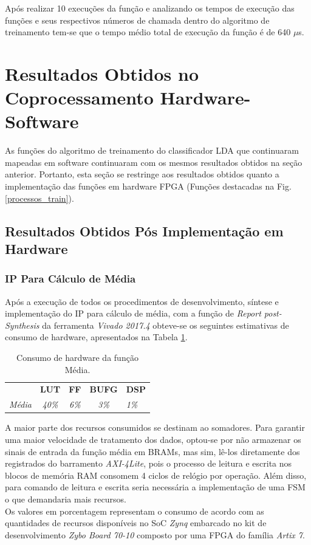 Após realizar 10 execuções da função e analizando os tempos de execução das funções e seus respectivos números de chamada dentro do algoritmo de treinamento tem-se que o tempo médio total de execução da função é de 640 $\mu$s.

\section{Resultados Obtidos no Coprocessamento Hardware-Software}
As funções do algoritmo de treinamento do classificador LDA que continuaram mapeadas em software continuaram com os mesmos resultados obtidos na seção anterior. Portanto, esta seção se restringe aos resultados obtidos quanto a implementação das funções em hardware FPGA (Funções destacadas na Fig. \ref{processos_train}).

\subsection{Resultados Obtidos Pós Implementação em Hardware}
\subsubsection{IP Para Cálculo de Média}

Após a execução de todos os procedimentos de desenvolvimento, síntese e implementação do IP para cálculo de média, com a função de \textit{Report post-Synthesis} da ferramenta \textit{Vivado 2017.4} obteve-se os seguintes estimativas de consumo de hardware, apresentados na Tabela \ref{consumo_media}.

\begin{table}[!h]
	\centering
	\caption{Consumo de hardware da função Média.}
	\label{consumo_media}
	\begin{tabular}{ccccl}
		\textbf{}         & \textbf{LUT}  & \textbf{FF}  & \textbf{BUFG} & \textbf{DSP} \\
		\textit{Média} & \textit{40\%} & \textit{6\%} & \textit{3\%}  & \textit{1\%}
	\end{tabular}
\end{table}

A maior parte dos recursos consumidos se destinam ao somadores. Para garantir uma maior velocidade de tratamento dos dados, optou-se por não armazenar os sinais de entrada da função média em BRAMs, mas sim, lê-los diretamente dos registrados do barramento \textit{AXI-4Lite}, pois o processo de leitura e escrita nos blocos de memória RAM consomem 4 ciclos de relógio por operação. Além disso, para comando de leitura e escrita seria necessária a implementação de uma FSM o que demandaria mais recursos.\\
Os valores em porcentagem representam o consumo de acordo com as quantidades de recursos disponíveis no SoC \textit{Zynq} embarcado no kit de desenvolvimento \textit{Zybo Board 70-10} composto por uma FPGA do família \textit{Artix 7}.

